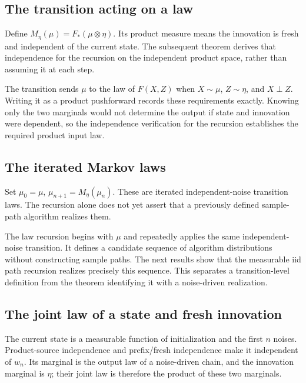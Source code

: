 \documentclass[11pt,a4paper]{report}
\begin{document}
\subsection{\texorpdfstring{The transition acting on a law}{The transition acting on a law}}
\label{report-step-UnadjustedLangevin-MarkovLaw-lean-5}


Define \(M_\eta(\mu)=F_*(\mu\otimes\eta)\). Its product measure means the innovation is fresh and independent of the current state. The subsequent theorem derives that independence for the recursion on the independent product space, rather than assuming it at each step.



The transition sends \(\mu\) to the law of \(F(X,Z)\) when \(X\sim\mu\), \(Z\sim\eta\), and \(X\perp Z\). Writing it as a product pushforward records these requirements exactly. Knowing only the two marginals would not determine the output if state and innovation were dependent, so the independence verification for the recursion establishes the required product input law.

\subsection{\texorpdfstring{The iterated Markov laws}{The iterated Markov laws}}
\label{report-step-UnadjustedLangevin-MarkovLaw-lean-6}


Set \(\mu_0=\mu\), \(\mu_{n+1}=M_\eta(\mu_n)\). These are iterated independent-noise transition laws. The recursion alone does not yet assert that a previously defined sample-path algorithm realizes them.



The law recursion begins with \(\mu\) and repeatedly applies the same independent-noise transition. It defines a candidate sequence of algorithm distributions without constructing sample paths. The next results show that the measurable iid path recursion realizes precisely this sequence. This separates a transition-level definition from the theorem identifying it with a noise-driven realization.

\subsection{\texorpdfstring{The joint law of a state and fresh innovation}{The joint law of a state and fresh innovation}}
\label{report-step-UnadjustedLangevin-MarkovLaw-lean-7}


The current state is a measurable function of initialization and the first \(n\) noises. Product-source independence and prefix/\allowbreak{}fresh independence make it independent of \(w_n\). Its marginal is the output law of a noise-driven chain, and the innovation marginal is \(\eta\); their joint law is therefore the product of these two marginals.
\end{document}
